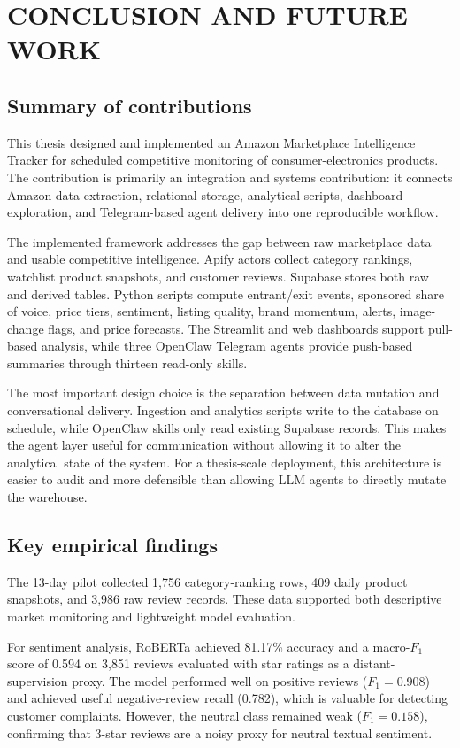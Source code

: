 \chapter{CONCLUSION AND FUTURE WORK}
\label{chap:conclusion}

\section{Summary of contributions}

This thesis designed and implemented an Amazon Marketplace Intelligence Tracker for scheduled competitive monitoring of consumer-electronics products. The contribution is primarily an integration and systems contribution: it connects Amazon data extraction, relational storage, analytical scripts, dashboard exploration, and Telegram-based agent delivery into one reproducible workflow.

The implemented framework addresses the gap between raw marketplace data and usable competitive intelligence. Apify actors collect category rankings, watchlist product snapshots, and customer reviews. Supabase stores both raw and derived tables. Python scripts compute entrant/exit events, sponsored share of voice, price tiers, sentiment, listing quality, brand momentum, alerts, image-change flags, and price forecasts. The Streamlit and web dashboards support pull-based analysis, while three OpenClaw Telegram agents provide push-based summaries through thirteen read-only skills.

The most important design choice is the separation between data mutation and conversational delivery. Ingestion and analytics scripts write to the database on schedule, while OpenClaw skills only read existing Supabase records. This makes the agent layer useful for communication without allowing it to alter the analytical state of the system. For a thesis-scale deployment, this architecture is easier to audit and more defensible than allowing LLM agents to directly mutate the warehouse.

\section{Key empirical findings}

The 13-day pilot collected 1,756 category-ranking rows, 409 daily product snapshots, and 3,986 raw review records. These data supported both descriptive market monitoring and lightweight model evaluation.

For sentiment analysis, RoBERTa achieved 81.17\% accuracy and a macro-$F_1$ score of 0.594 on 3,851 reviews evaluated with star ratings as a distant-supervision proxy. The model performed well on positive reviews ($F_1 = 0.908$) and achieved useful negative-review recall (0.782), which is valuable for detecting customer complaints. However, the neutral class remained weak ($F_1 = 0.158$), confirming that 3-star reviews are a noisy proxy for neutral textual sentiment.

